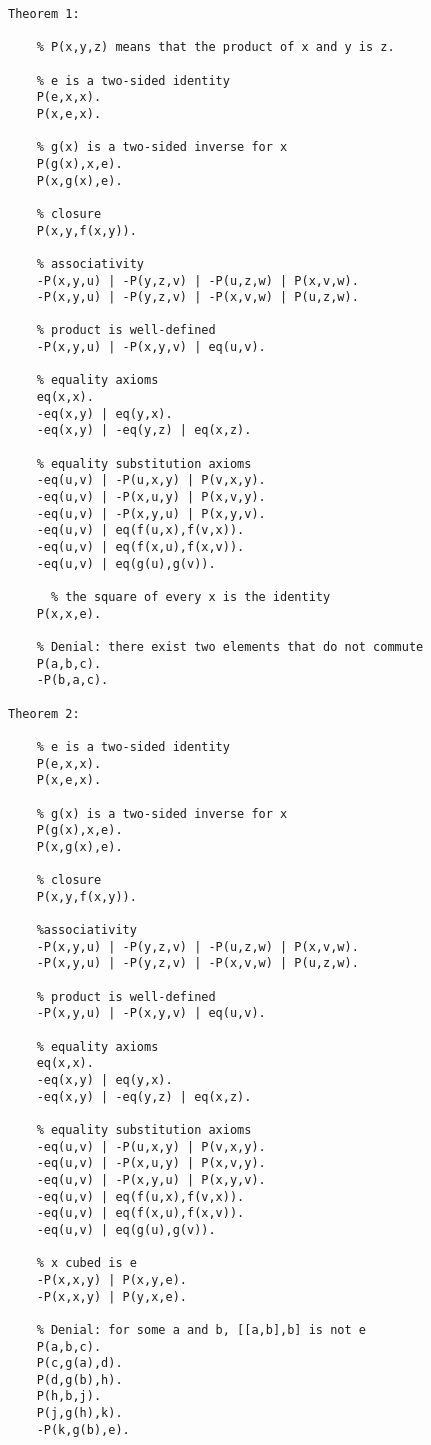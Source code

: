\begin{verbatim}
Theorem 1:   
  
    % P(x,y,z) means that the product of x and y is z.

    % e is a two-sided identity
    P(e,x,x).
    P(x,e,x).
  
    % g(x) is a two-sided inverse for x
    P(g(x),x,e).
    P(x,g(x),e).
  
    % closure
    P(x,y,f(x,y)).
  
    % associativity
    -P(x,y,u) | -P(y,z,v) | -P(u,z,w) | P(x,v,w).
    -P(x,y,u) | -P(y,z,v) | -P(x,v,w) | P(u,z,w).
  
    % product is well-defined
    -P(x,y,u) | -P(x,y,v) | eq(u,v).
  
    % equality axioms
    eq(x,x).
    -eq(x,y) | eq(y,x).
    -eq(x,y) | -eq(y,z) | eq(x,z).
  
    % equality substitution axioms
    -eq(u,v) | -P(u,x,y) | P(v,x,y).
    -eq(u,v) | -P(x,u,y) | P(x,v,y).
    -eq(u,v) | -P(x,y,u) | P(x,y,v).
    -eq(u,v) | eq(f(u,x),f(v,x)).
    -eq(u,v) | eq(f(x,u),f(x,v)).
    -eq(u,v) | eq(g(u),g(v)).
  
      % the square of every x is the identity
    P(x,x,e).
    
    % Denial: there exist two elements that do not commute
    P(a,b,c).
    -P(b,a,c).
  
Theorem 2:
  
    % e is a two-sided identity
    P(e,x,x).
    P(x,e,x).
  
    % g(x) is a two-sided inverse for x
    P(g(x),x,e).
    P(x,g(x),e).
  
    % closure
    P(x,y,f(x,y)).
  
    %associativity
    -P(x,y,u) | -P(y,z,v) | -P(u,z,w) | P(x,v,w).
    -P(x,y,u) | -P(y,z,v) | -P(x,v,w) | P(u,z,w).
  
    % product is well-defined
    -P(x,y,u) | -P(x,y,v) | eq(u,v).
  
    % equality axioms
    eq(x,x).
    -eq(x,y) | eq(y,x).
    -eq(x,y) | -eq(y,z) | eq(x,z).
  
    % equality substitution axioms
    -eq(u,v) | -P(u,x,y) | P(v,x,y).
    -eq(u,v) | -P(x,u,y) | P(x,v,y).
    -eq(u,v) | -P(x,y,u) | P(x,y,v).
    -eq(u,v) | eq(f(u,x),f(v,x)).
    -eq(u,v) | eq(f(x,u),f(x,v)).
    -eq(u,v) | eq(g(u),g(v)).
  
    % x cubed is e
    -P(x,x,y) | P(x,y,e).
    -P(x,x,y) | P(y,x,e).

    % Denial: for some a and b, [[a,b],b] is not e
    P(a,b,c).
    P(c,g(a),d).
    P(d,g(b),h).
    P(h,b,j).
    P(j,g(h),k).
    -P(k,g(b),e).
  

\end{verbatim}
